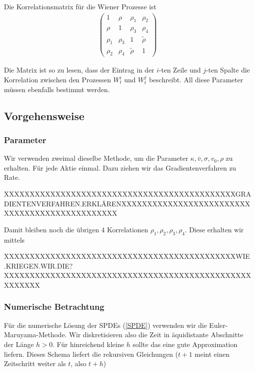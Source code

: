 \documentclass[12pt]{article}
\begin{document}
Die Korrelationsmatrix für die Wiener Prozesse ist
\begin{align} \label{korrel}
\left(
\begin{matrix}
1& \rho& \rho_1& \rho_2\\
\rho& 1& \rho_3& \rho_4\\
\rho_1& \rho_3& 1& \tilde{\rho}\\
\rho_2& \rho_4& \tilde{\rho}& 1
\end{matrix}
\right)
\end{align}

Die Matrix ist so zu lesen, dass der Eintrag in der $i$-ten Zeile und $j$-ten Spalte die Korrelation zwischen den Prozessen $W^i_t$ und $W^j_t$ beschreibt. All diese Parameter müssen ebenfalls bestimmt werden.


\subsection{Vorgehensweise}

\subsubsection{Parameter}

Wir verwenden zweimal dieselbe Methode, um die Parameter $\kappa, \bar{v}, \sigma, v_0, \rho$ zu erhalten. Für jede Aktie einmal. Dazu ziehen wir das Gradientenverfahren zu Rate.

XXXXXXXXXXXXXXXXXXXXXXXXXXXXXXXXXXXXXXXXXXXXXGRADIENTENVERFAHREN.ERKLÄRENXXXXXXXXXXXXXXXXXXXXXXXXXXXXXXXXXXXXXXXXXXXXXXX

Damit bleiben noch die übrigen 4 Korrelationen $\rho_1, \rho_2, \rho_3,\rho_4$. Diese erhalten wir mittels

XXXXXXXXXXXXXXXXXXXXXXXXXXXXXXXXXXXXXXXXXXXXXWIE.KRIEGEN.WIR.DIE?XXXXXXXXXXXXXXXXXXXXXXXXXXXXXXXXXXXXXXXXXXXXXXXXXXXXXXX


\subsubsection{Numerische Betrachtung}

Für die numerische Lösung der SPDEs (\ref{SPDE}) verwenden wir die Euler-Maruyama-Methode. Wir diskretisieren also die Zeit in äquidistante Abschnitte der Länge $h>0$. Für hinreichend kleine $h$ sollte das eine gute Approximation liefern. Dieses Schema liefert die rekursiven Gleichungen ($t+1$ meint einen Zeitschritt weiter als $t$, also $t+h$)
\end{document}
